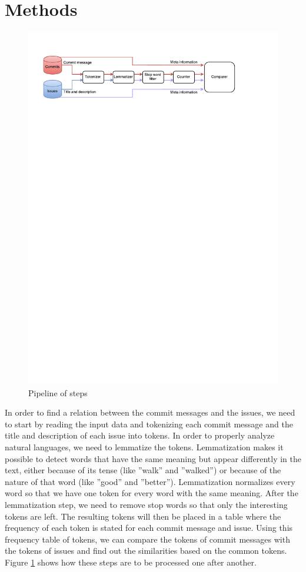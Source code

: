 \section{Methods}
\label{sec:methods}

\begin{figure}[t]
  \centering
  \includegraphics[width=\textwidth,trim={0 24cm 0 0},clip]{images/methods_vis.pdf}
  \caption{Pipeline of steps}
  \label{fig:methods_vis}
\end{figure}

In order to find a relation between the commit messages and the issues, we need to start by reading the input data and tokenizing each commit message and the title and description of each issue into tokens. In order to properly analyze natural languages, we need to lemmatize the tokens. Lemmatization makes it possible to detect words that have the same meaning but appear differently in the text, either because of its tense (like ''walk'' and ''walked'') or because of the nature of that word (like ''good'' and ''better''). Lemmatization normalizes every word so that we have one token for every word with the same meaning. After the lemmatization step, we need to remove stop words so that only the interesting tokens are left. The resulting tokens will then be placed in a table where the frequency of each token is stated for each commit message and issue. Using this frequency table of tokens, we can compare the tokens of commit messages with the tokens of issues and find out the similarities based on the common tokens.
Figure \ref{fig:methods_vis} shows how these steps are to be processed one after another.


